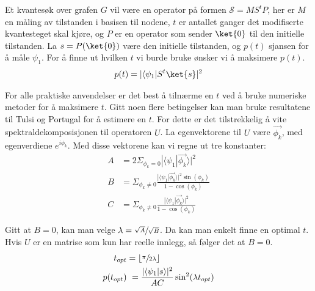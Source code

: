         Et kvantesøk over grafen $G$ vil være en operator på formen $\mathcal{S} = MS^tP$, her er $M$ en måling av tilstanden i basisen til nodene, $t$ er antallet ganger det modifiserte kvantesteget skal kjøre, og $P$ er en operator som sender $\ket{0}$ til den initielle tilstanden. La $s = P(\ket{0})$ være den initielle tilstanden, og $p(t)$ sjansen for å måle $\psi_1$. For å finne ut hvilken $t$ vi burde bruke ønsker vi å maksimere $p(t)$.
        \begin{align*}
            p(t) = |\langle\psi_1|S^t\ket{s}|^2 
        \end{align*}

        For alle praktiske anvendelser er det best å tilnærme en $t$ ved å bruke numeriske metoder for å maksimere $t$. Gitt noen flere betingelser kan man bruke resultatene til Tulsi og Portugal for å estimere en $t$. For dette er det tilstrekkelig å vite spektraldekomposisjonen til operatoren $U$. La egenvektorene til $U$ være $\vec{\phi_k}$, med egenverdiene $e^{i\phi_k}$. Med disse vektorene kan vi regne ut tre konstanter:
        \begin{align*}
            A & = 2\Sigma_{\phi_k=0}|\langle\psi_1|\vec{\phi_k}\rangle|^2 \\
            B & = \Sigma_{\phi_k\neq 0}\frac{|\langle\psi_1|\vec{\phi_k}\rangle|^2\sin(\phi_k)}{1-\cos(\phi_k)} \\
            C & = \Sigma_{\phi_k\neq 0}\frac{|\langle\psi_1|\vec{\phi_k}\rangle|^2}{1-\cos(\phi_k)}
        \end{align*}

        Gitt at $B=0$, kan man velge $\lambda = \sfrac{\sqrt{A}}{\sqrt{B}}$. Da kan man enkelt finne en optimal $t$. Hvis $U$ er en matrise som kun har reelle innlegg, så følger det at $B=0$.
        \begin{align*}
            t_{opt} & = \lfloor \sfrac{\pi}{2\lambda} \rfloor \\
            p(t_{opt}) & = \frac{|\langle \psi_1|s\rangle|^2}{AC}\sin^2(\lambda t_{opt})
        \end{align*}